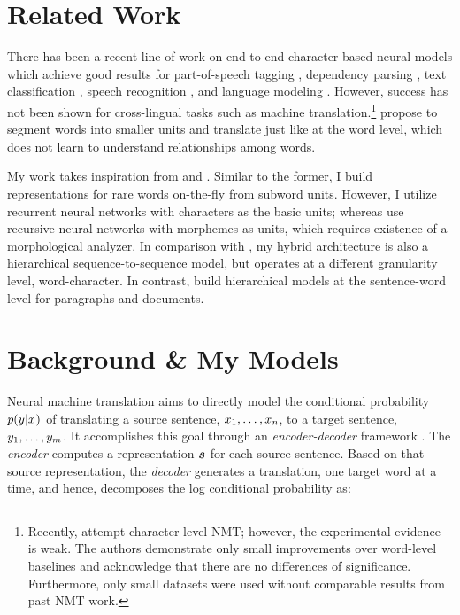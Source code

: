 \section{Related Work}
There has been a recent line of work on end-to-end character-based neural models
which achieve good results for part-of-speech tagging \cite{santos14,ling15function},
dependency parsing \cite{ballesteros15}, text classification
\cite{zhang15}, speech recognition \cite{chan16,bahdanau16}, and language
modeling \cite{kim16,rafal16}. However, success has not been shown for
cross-lingual tasks such as machine translation.\footnote{Recently,
 attempt character-level NMT; however,
the experimental evidence is weak. The authors demonstrate only small
improvements over word-level baselines and acknowledge that there are no differences of
significance. Furthermore, only small datasets were used without
comparable results from past NMT work.}
 propose to segment words into smaller units and
translate just like at the word level, which does not learn to understand
relationships among words.

My work takes inspiration from \cite{luong13} and 
\cite{li15}. Similar to the former, I build representations for rare words
on-the-fly from subword units. However, I utilize recurrent neural networks
with characters as the basic units; whereas  use recursive neural
networks with morphemes as units, which requires existence of a
morphological analyzer. In comparison with \cite{li15}, my hybrid architecture
is also a hierarchical sequence-to-sequence model, but operates at a different
granularity level, word-character. In contrast,  build
hierarchical models at the sentence-word level for paragraphs and documents.

\section{Background \& My Models}
\label{sec:nmt}
\begin{sloppypar}
Neural machine translation aims to directly model the conditional probability $p(y_{}|x_{})$ of translating
a source sentence, $x_{1},\ldots,x_{n}$, to a target sentence, $y_{1},\ldots,y_{m}$.
It accomplishes this goal through an {\it encoder-decoder} framework
\cite{kal13,sutskever14,cho14}. The {\it encoder} computes a representation $\mbox{\boldmath{$s$}}$
for each source sentence. Based on that source representation,
the {\it decoder} generates a translation, one target word at a time, and hence,
decomposes the log conditional probability as:
\end{sloppypar}

